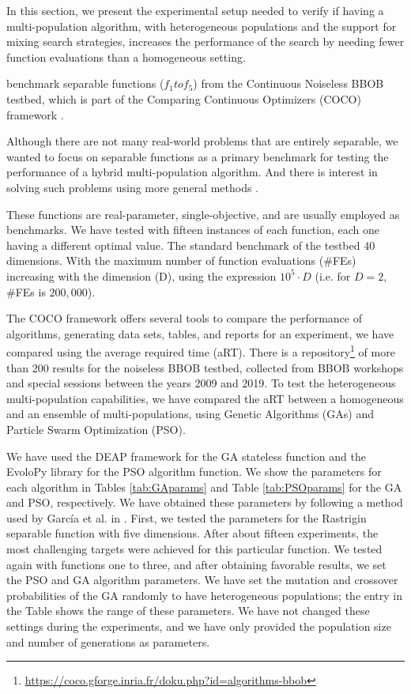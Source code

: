 In this section, we present the experimental setup needed 
to verify if having a multi-population algorithm, with
heterogeneous populations and the support for mixing search strategies,
increases the performance of the search by needing fewer function evaluations
than a homogeneous setting.

benchmark separable functions ($f_1 to f_5 $) from the Continuous Noiseless
BBOB testbed, which is part of the Comparing Continuous Optimizers (COCO)
framework \cite{hansen2016coco}. 

Although there are not many real-world
problems that are entirely separable, we wanted to focus on separable functions
as a primary benchmark for testing the performance of a hybrid multi-population
algorithm. And there is interest in solving such problems using more
general methods \cite{doerr2013evolutionary,swarzberg1994step}. %

These functions are real-parameter, single-objective, and are
usually employed as benchmarks. We have tested with fifteen instances of each
function, each one having a different optimal value. The standard benchmark of
the testbed %
40 dimensions. With the maximum number of function evaluations (\#FEs)
increasing with the dimension (D), using the expression $10^5 \cdot D$ (i.e.
for $D = 2$, \#FEs is $200,000$).

The COCO framework offers several tools to compare the performance of
algorithms, generating data sets, tables, and reports for an experiment, we have
compared using the average required time (aRT). There is a
repository\footnote{\url{https://coco.gforge.inria.fr/doku.php?id=algorithms-bbob}}
of more than 200 results for the noiseless BBOB testbed, collected from BBOB
workshops and special sessions between the years 2009 and 2019. To test the
heterogeneous multi-population capabilities, we have compared the aRT between a
homogeneous and an ensemble of multi-populations, using Genetic Algorithms
(GAs) and Particle Swarm Optimization (PSO).

We have used the DEAP framework for the
GA stateless function \cite{fortin2012deap} and the EvoloPy library
\cite{faris2016evolopy} for the PSO algorithm function. We show the parameters
for each algorithm in Tables \ref{tab:GAparams} and Table \ref{tab:PSOparams}
for the GA and PSO, respectively. We have obtained these parameters by following a
method used by García et al. in \cite{garcia2017benchmarking}. First, we
tested the parameters for the Rastrigin separable function with five
dimensions. After about fifteen experiments, the most challenging targets were
achieved for this particular function. We tested again with functions one to
three, and after obtaining favorable results, we set the PSO and GA algorithm
parameters. We have set the mutation and crossover probabilities of the GA randomly
to have heterogeneous populations; the entry in the Table shows the range of these
parameters. We have not changed these settings during the experiments, and we have
only provided the population size and number of generations as parameters.

